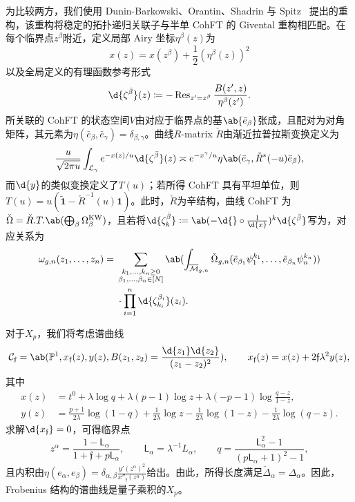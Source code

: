 \documentclass{amsart}
\theoremstyle{definition}
\theoremstyle{remark}
\theoremstyle{plain}
\theoremstyle{definition}
\theoremstyle{remark}
\renewcommand{\P}{\mathbb{P}}
\newcommand{\Mbar}{\overline{\mathcal{M}}}
\newcommand{\mc}[1]{\mathcal{#1}}
\newcommand{\mf}[1]{\mathfrak{#1}}
\newcommand{\mr}[1]{\mathrm{#1}}
\newcommand{\on}[1]{\operatorname{#1}}
\newcommand{\ms}[1]{\mathsf{#1}}
\newcommand{\wt}[1]{\widetilde{#1}}
\newcommand{\1}{\mathbf{1}}
\newcommand{\2}{\mathbf{2}}
\newcommand{\3}{\mathbf{3}}
\begin{document}
为比较两方，我们使用 Dunin-Barkowski、Orantin、Shadrin 与 Spitz~\cite{DOSS2014} 提出的重构，该重构将稳定的拓扑递归关联子与半单 CohFT 的 Givental 重构相匹配。在每个临界点\(z^{\beta}\)附近，定义局部 Airy 坐标\(\eta^{\beta}(z)\)为
\[ x(z) = x(z^{\beta}) + \frac{1}{2}(\eta^{\beta}(z))^2 \]
以及全局定义的有理函数参考形式
\[ \d{\zeta^{\bar{\beta}}}(z) \coloneqq -\on{Res}_{z'=z^{\beta}}\frac{B(z',z)}{\eta^{\beta}(z')}. \]
所关联的 CohFT 的状态空间\(V\)由对应于临界点的基\(\ab\{\bar{e}_{\beta}\}\)张成，且配对为对角矩阵，其元素为\(\eta(\bar{e}_{\beta},\bar{e}_{\gamma}) = \delta_{\beta,\gamma}\)。曲线\(R\)-matrix \(\check{R}\)由渐近拉普拉斯变换定义为
\[ \frac{u}{\sqrt{2\pi u}}\int_{\mc{L}_{\gamma}} e^{-x(z)/u}\d{\zeta^{\bar{\beta}}}(z) \asymp e^{-x^{\gamma}/u}\eta\ab(\bar{e}_{\gamma}, \check{R}^*(-u)\bar{e}_{\beta}), \]
而\(\d{y}\)的类似变换定义了\(T(u)\)；若所得 CohFT 具有平坦单位，则\(T(u) = u(\wt{\1}-\check{R}^{-1}(u)\1)\)。此时，\(\check{R}\)为辛结构，曲线 CohFT 为\(\check{\Omega} = \check{R}.T.\ab(\bigoplus_{\beta}\Omega^{\mr{KW}}_{\beta})\)，且若将\(\d{\zeta^{\bar{\beta}}_k} \coloneqq \ab(-\d{} \circ \frac{1}{\d{x}})^k \d{\zeta^{\bar{\beta}}}\)写为，对应关系为
\begin{align*}
    \omega_{g,n}(z_1,\ldots,z_n) ={}& \sum_{\substack{k_1,\ldots,k_n \geq 0 \\ \beta_1,\ldots,\beta_n \in [N]}}\ab(\int_{\Mbar_{g,n}} \check{\Omega}_{g,n}(\bar{e}_{\beta_1}\psi_1^{k_1},\ldots,\bar{e}_{\beta_n}\psi_n^{k_n})) \\*
    &\cdot \prod_{i=1}^n \d{\zeta^{\beta_i}_{k_i}}(z_i).
\end{align*}

对于\(X_p\)，我们将考虑谱曲线
\[ \mc{C}_{\mf{f}} = \ab(\P^1, x_{\mf{f}}(z), y(z), B(z_1,z_2) = \frac{\d{z_1}\d{z_2}}{(z_1-z_2)^2}), \qquad x_{\mf{f}}(z) = x(z) + 2\mf{f}\lambda^2 y(z), \]
其中
\begin{align*}
    x(z) &= t^0 + \lambda \log q + \lambda(p-1)\log z + \lambda(-p-1)\log\frac{q-z}{1-z}, \\
    y(z) &= \frac{p+1}{2\lambda}\log(1-q) + \frac{1}{2\lambda}\log z - \frac{1}{2\lambda}\log(1-z) - \frac{1}{2\lambda}\log(q-z).
\end{align*}
求解\(\d{x_{\mf{f}}} = 0\)，可得临界点
\[ z^{\alpha} = \frac{1-\ms{L}_{\alpha}}{1+\mf{f}+p\ms{L}_{\alpha}}, \qquad \ms{L}_{\alpha} = \lambda^{-1}L_{\alpha}, \qquad q = \frac{\ms{L}_{\alpha}^2-1}{(p\ms{L}_{\alpha}+1)^2-1}, \]
且内积由\(\eta(e_{\alpha},e_{\beta}) = \delta_{\alpha,\beta}\frac{y'(z^{\alpha})^2}{x''_{\mf{f}}(z^{\alpha})}\)给出。由此，所得长度满足\(\check{\Delta}_{\alpha} = \Delta_{\alpha}\)。因此，Frobenius 结构的谱曲线是量子乘积的\(X_p\)。
\end{document}
